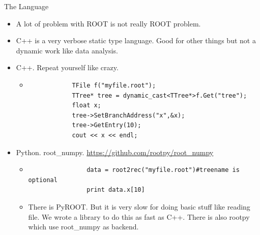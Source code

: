 \documentclass{beamer}
\begin{document}
\begin{frame}[fragile]{The Language}
	\begin{itemize}
	\item A lot of problem with ROOT is not really ROOT problem.
	\item C++ is a very verbose static type language. Good for other things but not a dynamic work like data analysis.
	\item C++. Repeat yourself like crazy.
		\begin{itemize}
		\item
		\begin{verbatim}
			TFile f("myfile.root");
			TTree* tree = dynamic_cast<TTree*>f.Get("tree");
			float x;
			tree->SetBranchAddress("x",&x);
			tree->GetEntry(10);
			cout << x << endl;
		\end{verbatim}
		\end{itemize}
	\item Python. root\_numpy. \url{https://github.com/rootpy/root_numpy}
		\begin{itemize}
			\item 
			\begin{verbatim}
				data = root2rec("myfile.root")#treename is optional
				print data.x[10]
			\end{verbatim}
			\item There is PyROOT. But it is very slow for doing basic stuff like reading file. We wrote a library to do this as fast as C++. There is also rootpy which use root\_numpy as backend.
		\end{itemize}
	\end{itemize}
\end{frame}
\end{document}
